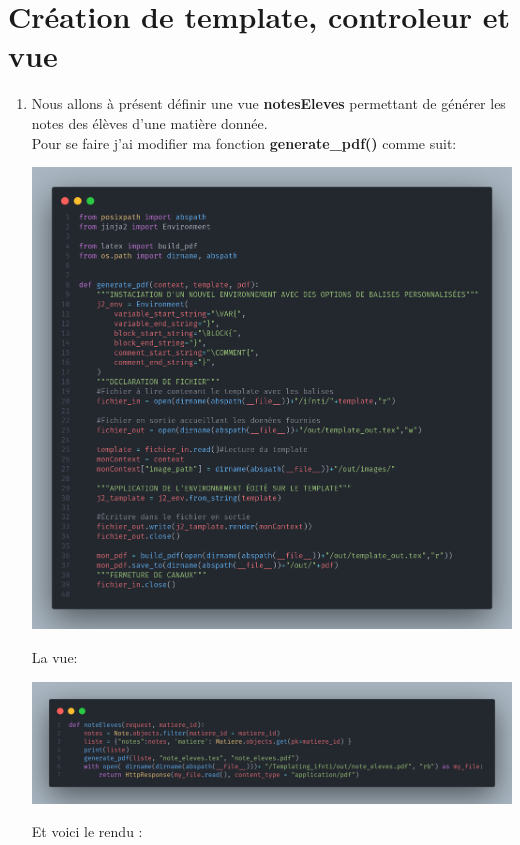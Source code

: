 \documentclass[11pt,a4paper]{article}
\begin{document}
\section{Création de template, controleur et vue}
\begin{enumerate}
\item Nous allons à présent définir une vue \textbf{notesEleves} permettant de générer les notes des élèves d'une matière donnée.\\
Pour se faire j'ai modifier ma fonction \textbf{generate\_pdf()} comme suit:
	\begin{center}
		\includegraphics[scale=0.2]{images/nouv.png}
	\end{center}
	La vue:
	\begin{center}
		\includegraphics[scale=0.2]{images/notes.png}
	\end{center}
	Et voici le rendu :
	\begin{center}

\end{center}
\end{enumerate}
\end{document}
